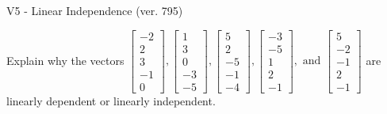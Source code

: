 \begin{exercise}
  \begin{exerciseTitle}V5 - Linear Independence (ver. 795)\end{exerciseTitle}
  \begin{exerciseStatement}
    Explain why the vectors \(\left[\begin{array}{r}
-2 \\
2 \\
3 \\
-1 \\
0
\end{array}\right] , \left[\begin{array}{r}
1 \\
3 \\
0 \\
-3 \\
-5
\end{array}\right] , \left[\begin{array}{r}
5 \\
2 \\
-5 \\
-1 \\
-4
\end{array}\right] , \left[\begin{array}{r}
-3 \\
-5 \\
1 \\
2 \\
-1
\end{array}\right] , \text{ and } \left[\begin{array}{r}
5 \\
-2 \\
-1 \\
2 \\
-1
\end{array}\right]\) are linearly dependent or linearly independent.	



\end{exerciseStatement}
\end{exercise}
